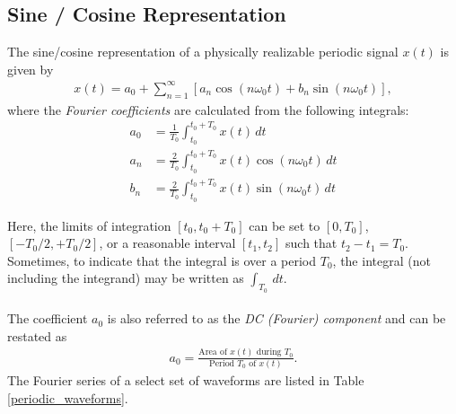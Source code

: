 \documentclass{report}
\begin{document}
\subsection{Sine / Cosine Representation}
\begin{tcolorbox}[width=\textwidth,colback={white}, sharp corners]
    The sine/cosine representation of a physically realizable periodic signal $x(t)$ is given by 
    \begin{align}
        x(t) = a_0 + \sum_{n=1}^{\infty}[a_n\cos(n\omega_0 t)+b_n\sin(n\omega_0 t)],
    \end{align}
    where the \emph{Fourier coefficients} are calculated from the following integrals:
    \begin{align}
        a_0 &= \frac{1}{T_0} \int_{t_0}^{t_0+T_0} x(t) \,dt \\
        a_n &= \frac{2}{T_0} \int_{t_0}^{t_0+T_0} x(t)\cos(n\omega_0 t) \,dt \\
        b_n &= \frac{2}{T_0} \int_{t_0}^{t_0+T_0} x(t)\sin(n\omega_0 t) \,dt
    \end{align} 
\end{tcolorbox}
Here, the limits of integration $[t_0, t_0+T_0]$ can be set to $[0,T_0]$, $[-T_0/2,+T_0/2]$, or a reasonable interval $[t_1,t_2]$ such that $t_2-t_1=T_0$. 
Sometimes, to indicate that the integral is over a period $T_0$, the integral (not including the integrand) may be written as $\int_{T_0} \,dt$.
\\ \\
The coefficient $a_0$ is also referred to as the \emph{DC (Fourier) component} and can be restated as
\begin{align}
    a_0 = \frac{\text{Area of } x(t) \text{ during } T_0}{\text{Period } T_0 \text{ of } x(t)}.
\end{align}
The Fourier series of a select set of waveforms are listed in Table \ref{periodic_waveforms}. 
\end{document}
